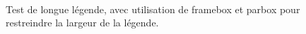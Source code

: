 \lipsum[1] %

\begin{figure}
	\centering %
	 \\ \parbox{0.75\textwidth}{\caption{Test de longue légende, avec utilisation de framebox et parbox pour restreindre la largeur de la légende.}\label{fig:vueEts}} %
\end{figure}

\lipsum[1] %